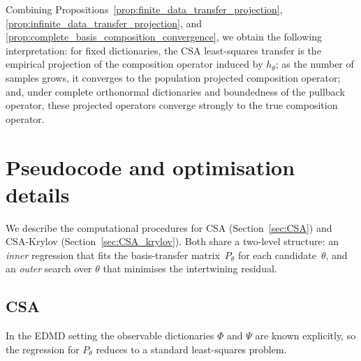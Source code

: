 \documentclass{article}
\theoremstyle{definition}
\begin{document}
Combining Propositions~\ref{prop:finite_data_transfer_projection},
\ref{prop:infinite_data_transfer_projection}, and
\ref{prop:complete_basis_composition_convergence}, we obtain the following interpretation:
for fixed dictionaries, the CSA least-squares transfer is the empirical projection of the
composition operator induced by $h_\theta$; as the number of samples grows, it converges
to the population projected composition operator; and, under complete orthonormal
dictionaries and boundedness of the pullback operator, these projected operators converge
strongly to the true composition operator.



\section{Pseudocode and optimisation details}
\label{app:pseudocode}

We describe the computational procedures for CSA (Section~\ref{sec:CSA}) and
CSA-Krylov (Section~\ref{sec:CSA_krylov}). Both share a two-level structure:
an \emph{inner} regression that fits the basis-transfer matrix~$P_\theta$ for
each candidate~$\theta$, and an \emph{outer} search over $\theta$ that
minimises the intertwining residual.

\subsection{CSA}

In the EDMD setting the observable dictionaries $\Phi$ and $\Psi$ are known
explicitly, so the regression for $P_\theta$ reduces to a standard
least-squares problem.
\end{document}
